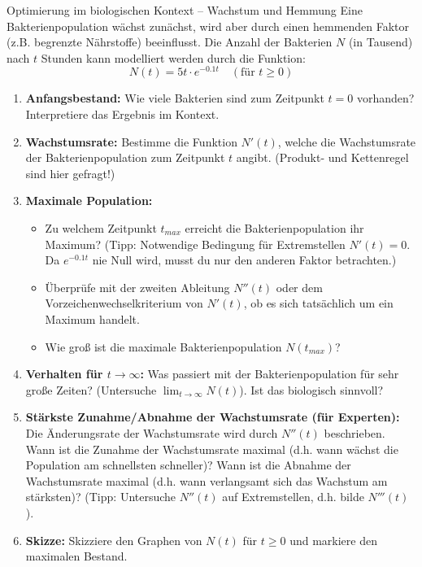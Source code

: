 \begin{aufgabenumgebung}{Optimierung im biologischen Kontext – Wachstum und Hemmung}
Eine Bakterienpopulation wächst zunächst, wird aber durch einen hemmenden Faktor (z.B. begrenzte Nährstoffe) beeinflusst. Die Anzahl der Bakterien $N$ (in Tausend) nach $t$ Stunden kann modelliert werden durch die Funktion:
\[ N(t) = 5t \cdot e^{-0.1t} \quad (\text{für } t \ge 0) \]
\begin{enumerate}
    \item \textbf{Anfangsbestand:} Wie viele Bakterien sind zum Zeitpunkt $t=0$ vorhanden? Interpretiere das Ergebnis im Kontext.
    \item \textbf{Wachstumsrate:} Bestimme die Funktion $N'(t)$, welche die Wachstumsrate der Bakterienpopulation zum Zeitpunkt $t$ angibt. (Produkt- und Kettenregel sind hier gefragt!)
    \item \textbf{Maximale Population:}
        \begin{itemize}
            \item Zu welchem Zeitpunkt $t_{max}$ erreicht die Bakterienpopulation ihr Maximum? (Tipp: Notwendige Bedingung für Extremstellen $N'(t)=0$. Da $e^{-0.1t}$ nie Null wird, musst du nur den anderen Faktor betrachten.)
            \item Überprüfe mit der zweiten Ableitung $N''(t)$ oder dem Vorzeichenwechselkriterium von $N'(t)$, ob es sich tatsächlich um ein Maximum handelt.
            \item Wie groß ist die maximale Bakterienpopulation $N(t_{max})$?
        \end{itemize}
    \item \textbf{Verhalten für $t \to \infty$:} Was passiert mit der Bakterienpopulation für sehr große Zeiten? (Untersuche $\lim_{t \to \infty} N(t)$). Ist das biologisch sinnvoll?
    \item \textbf{Stärkste Zunahme/Abnahme der Wachstumsrate (für Experten):}
        Die Änderungsrate der Wachstumsrate wird durch $N''(t)$ beschrieben. Wann ist die Zunahme der Wachstumsrate maximal (d.h. wann wächst die Population am schnellsten schneller)? Wann ist die Abnahme der Wachstumsrate maximal (d.h. wann verlangsamt sich das Wachstum am stärksten)? (Tipp: Untersuche $N''(t)$ auf Extremstellen, d.h. bilde $N'''(t)$).
    \item \textbf{Skizze:} Skizziere den Graphen von $N(t)$ für $t \ge 0$ und markiere den maximalen Bestand.
\end{enumerate}
\end{aufgabenumgebung}

